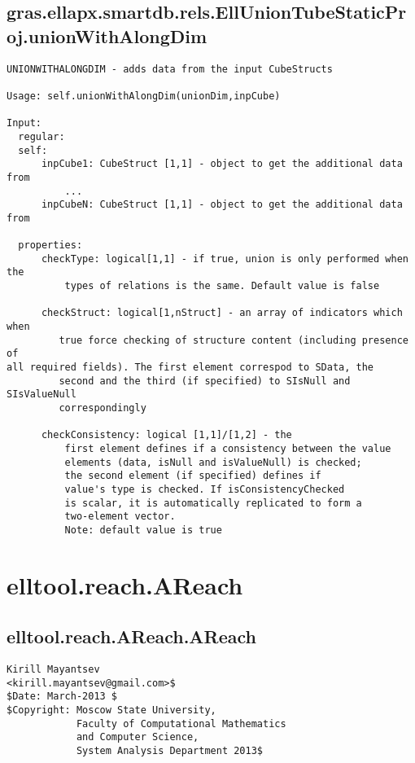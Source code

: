 \subsection{\texorpdfstring{gras.ellapx.smartdb.rels.EllUnionTubeStaticProj.unionWithAlongDim}{unionWithAlongDim}}\label{method:gras.ellapx.smartdb.rels.EllUnionTubeStaticProj.unionWithAlongDim}
\begin{verbatim}
UNIONWITHALONGDIM - adds data from the input CubeStructs

Usage: self.unionWithAlongDim(unionDim,inpCube)

Input:
  regular:
  self:
      inpCube1: CubeStruct [1,1] - object to get the additional data from
          ...
      inpCubeN: CubeStruct [1,1] - object to get the additional data from

  properties:
      checkType: logical[1,1] - if true, union is only performed when the
          types of relations is the same. Default value is false

      checkStruct: logical[1,nStruct] - an array of indicators which when
         true force checking of structure content (including presence of
all required fields). The first element correspod to SData, the
         second and the third (if specified) to SIsNull and SIsValueNull
         correspondingly

      checkConsistency: logical [1,1]/[1,2] - the
          first element defines if a consistency between the value
          elements (data, isNull and isValueNull) is checked;
          the second element (if specified) defines if
          value's type is checked. If isConsistencyChecked
          is scalar, it is automatically replicated to form a
          two-element vector.
          Note: default value is true
\end{verbatim}
\section{elltool.reach.AReach}\label{secClassDescr:elltool.reach.AReach}
\subsection{\texorpdfstring{elltool.reach.AReach.AReach}{AReach}}\label{method:elltool.reach.AReach.AReach}
\begin{verbatim}
Kirill Mayantsev
<kirill.mayantsev@gmail.com>$
$Date: March-2013 $
$Copyright: Moscow State University,
            Faculty of Computational Mathematics
            and Computer Science,
            System Analysis Department 2013$
\end{verbatim}
